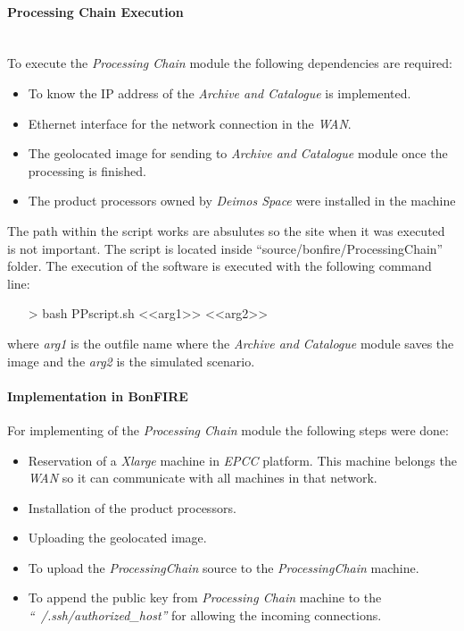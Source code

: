 \paragraph{Processing Chain Execution}~\\

To execute the \emph{Processing Chain} module the following dependencies are
required:
\begin{itemize}
\item To know the \ac{IP} address of the \emph{Archive and Catalogue} is
  implemented.
\item Ethernet interface for the network connection in the \bonfire \emph{WAN}.
\item The geolocated image for sending to \emph{Archive and Catalogue} module
  once the processing is finished. 
\item The product processors owned by \emph{Deimos Space} were installed in the
  machine
\end{itemize}

The path within the script works are absulutes so the site when it was executed
is not important. The script is located inside
``source/bonfire/ProcessingChain'' folder. The execution of the software is executed with the following
command line:
\begin{itemize}
\item[>] bash PPscript.sh <<arg1>> <<arg2>>
\end{itemize}

where \emph{arg1} is the outfile name where the \emph{Archive and Catalogue} module
saves the image and the \emph{arg2} is the simulated scenario.


\paragraph{Implementation in BonFIRE}

For implementing of the \emph{Processing Chain} module the following steps were done:

\begin{itemize}
 \item Reservation of a \emph{Xlarge} machine in \emph{EPCC} \bonfire
   platform. This machine belongs the \bonfire \emph{WAN} so it can communicate
   with all machines in that network. 
 \item Installation of the product processors.
 \item Uploading the geolocated image.
 \item To upload the \emph{ProcessingChain} source to the \emph{ProcessingChain}
   machine.
 \item To append the public key from \emph{Processing Chain} machine to the
   \emph{``~/.ssh/authorized\_host''} for
   allowing the incoming connections.
\end{itemize}

